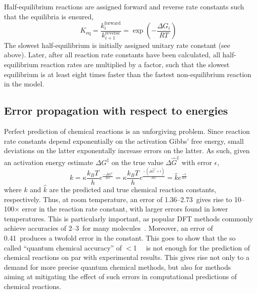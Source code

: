 Half-equilibrium reactions are assigned forward and reverse rate constants such that the equilibria is ensured,
% 
\begin{equation}
	K_\text{eq}
	= \frac{k_i^\text{forward}}{k_{i + 1}^\text{reverse}}
	= \exp \left(-\frac{\Delta G_i}{R T} \right)
\end{equation}
% 
The slowest half-equilibrium is initially assigned unitary rate constant (see above).
Later,
after all reaction rate constants have been calculated,
all half-equilibrium reaction rates are multiplied by a factor,
such that the slowest equilibrium is at least eight times faster than the fastest non-equilibrium reaction in the model.

\subsection{Error propagation with respect to energies}%
\label{sec:rates-error-prop}

Perfect prediction of chemical reactions is an unforgiving problem.
Since reaction rate constants depend exponentially on the activation Gibbs' free energy,
small deviations on the latter exponentally increase errors on the latter.
As such,
given an activation energy estimate $\Delta G^\ddagger$
on the true value $\Delta \widehat{G}^\ddagger$
with error $\epsilon$,
%
\begin{equation}
	k = \kappa \frac{k_B T}{h} e^\frac{- \Delta G^\ddagger}{R T}
	= \kappa \frac{k_B T}{h} e^\frac{- \left(\Delta \widehat{G}^\ddagger + \epsilon\right)}{R T}
	= \widehat{k} e^\frac{- \epsilon}{R T}
\end{equation}
%
where $k$ and $\widehat{k}$ are the predicted and true chemical reaction constants,
respectively.
Thus,
at room temperature,
an error of 1.36--2.73~\kcalmol gives rise to 10--100$\times$ error
in the reaction rate constant,
with larger errors found in lower temperatures.
This is particularly important,
as popular DFT methods commonly achieve accuracies of
2--3~\kcalmol for many molecules~\cite{Becke_2014,Bogojeski_2020}.
Moreover,
an error of 0.41~\kcalmol produces a twofold error in the constant.
This goes to show that the so called ``quantum chemical accuracy'' of
$<$1~\kcalmol~\cite{Bogojeski_2020}
is not enough for the prediction of chemical reactions on par with experimental results.
This gives rise not only to a demand
for more precise quantum chemical methods,
but also for methods aiming at mitigating the effect of such errors
in computational predictions of chemical reactions.

